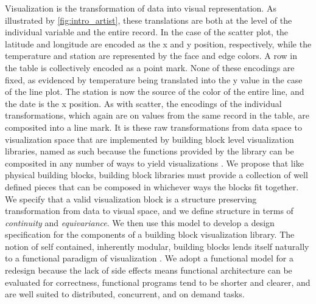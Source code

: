 \documentclass[../main.tex]{subfiles}
\begin{document}
Visualization is the transformation of data into visual representation. As illustrated by \autoref{fig:intro_artist}, these translations are both at the level of the individual variable and the entire record. In the case of the scatter plot, the latitude and longitude are encoded as the x and y position, respectively, while the temperature and station are represented by the face and edge colors. A row in the table is collectively encoded as a point mark. None of these encodings are fixed, as evidenced by temperature being translated into the y value in the case of the line plot. The station is now the source of the color of the entire line, and the date is the x position. As with scatter, the encodings of the individual transformations, which again are on values from the same record in the table, are composited into a line mark. It is these raw transformations from data space to visualization space that are implemented by building block level visualization libraries, named as such because the functions provided by the library can be composited in any number of ways to yield visualizations \cite{wongsuphasawatNavigatingWideWorld2021}. We propose that like physical building blocks, building block libraries must provide a collection of well defined pieces that can be composed in whichever ways the blocks fit together. We specify that a valid visualization block is a structure preserving transformation from data to visual space, and we define structure in terms of \textit{continuity} and \textit{equivariance}. We then use this model to develop a design specification for the components of a building block visualization library. The notion of self contained, inherently modular, building blocks lends itself naturally to a functional paradigm of visualization \cite{hughesWhyFunctionalProgramming1989}. We adopt a functional model for a redesign because the lack of side effects means functional architecture can be evaluated for correctness, functional programs tend to be shorter and clearer, and are well suited to distributed, concurrent, and on demand tasks\cite{huHowFunctionalProgramming2015}.
\end{document}
